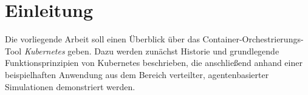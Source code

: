 \documentclass[11pt,a4paper]{article}
\begin{document}
\tableofcontents




\section{Einleitung}
\label{sec:einleitung}
Die vorliegende Arbeit soll einen Überblick über das Container-\linebreak Orchestrierungs-Tool \emph{Kubernetes} geben. 
Dazu werden zunächst Historie und grundlegende Funktionsprinzipien von Kubernetes beschrieben, die anschließend
anhand einer beispielhaften Anwendung aus dem Bereich verteilter, agentenbasierter Simulationen demonstriert werden.
\end{document}
